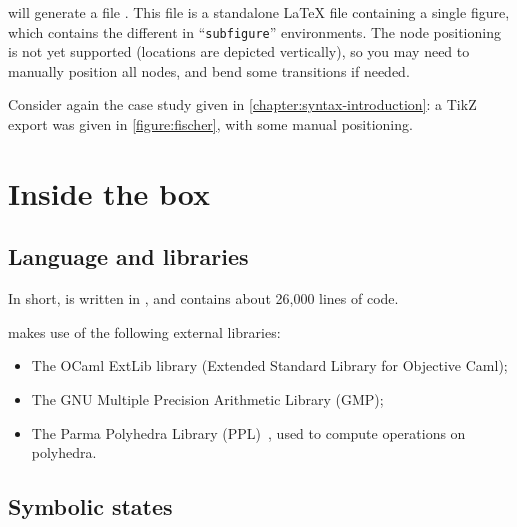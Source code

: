 \imitator{} will generate a file .
This file is a standalone \LaTeX{} file containing a single figure, which contains the different \IPTA{} in ``\texttt{subfigure}'' environments.
The node positioning is not yet supported (locations are depicted vertically), so you may need to manually position all nodes, and bend some transitions if needed.


\begin{example}
	Consider again the case study given in \cref{chapter:syntax-introduction}: a TikZ export was given in \cref{figure:fischer}, with some manual positioning.
\end{example}






\chapter{Inside the box}


\section{Language and libraries}

In short, \imitator{} is written in \ocaml{}, and contains about 26,000 lines of code.

\imitator{} makes use of the following external libraries:

\begin{itemize}
	\item The OCaml ExtLib library (Extended Standard Library for Objective Caml);
	\item The GNU Multiple Precision Arithmetic Library (GMP);
	\item The Parma Polyhedra Library (PPL)~\cite{BHZ08}, used to compute operations on polyhedra.
\end{itemize}


\section{Symbolic states}

